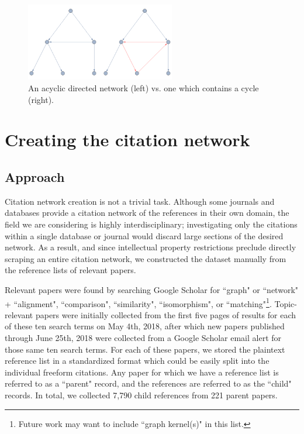 \documentclass[12pt]{thesis}
\theoremstyle{plain}
\theoremstyle{definition}
\theoremstyle{remark}
\begin{document}
\begin{figure}[t!]
\centering
\includegraphics[width=0.58\textwidth]{acyclic_demo.png}
\caption{An acyclic directed network (left) vs. one which contains a cycle (right).}
\label{fig:acyclic_demo}
\end{figure}
















\chapter{Creating the citation network}\label{chapter:dataset_creation_and_analysis}

\section{Approach}

Citation network creation is not a trivial task. Although some journals and databases provide a citation network of the references in their own domain, the field we are considering is highly interdisciplinary; investigating only the citations within a single database or journal would discard large sections of the desired network. As a result, and since intellectual property restrictions preclude directly scraping an entire citation network, we constructed the dataset manually from the reference lists of relevant papers.

Relevant papers were found by searching Google Scholar for ``graph" or ``network" +  ``alignment", ``comparison", ``similarity", ``isomorphism", or ``matching"\footnote{Future work may want to include ``graph kernel(s)" in this list.}. Topic-relevant papers were initially collected from the first five pages of results for each of these ten search terms on May 4th, 2018, after which new papers published through June 25th, 2018 were collected from a Google Scholar email alert for those same ten search terms. For each of these papers, we stored the plaintext reference list in a standardized format which could be easily split into the individual freeform citations. Any paper for which we have a reference list is referred to as a ``parent" record, and the references are referred to as the ``child" records. In total, we collected 7,790 child references from 221 parent papers.
\end{document}
